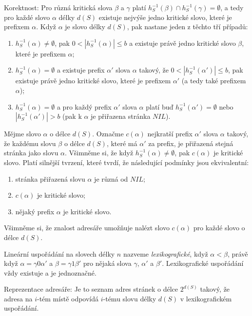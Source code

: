 \documentclass[a4paper,12pt]{article}
\begin{document}
Korektnost: Pro různá kritická slova 
$\beta$ a $\gamma$ platí $h^{-1}_S(\beta )\cap h^{-1}_S(\gamma 
)=\emptyset$, a tedy pro každé slovo $\alpha$ 
délky $d(S)$ existuje nejvýše jedno kritické slovo, které 
je prefixem $\alpha$. Když $\alpha$ je slovo délky $d(S)$, pak nastane 
jeden z těchto tří případů:
\begin{enumerate}
\item
$h^{-1}_S(\alpha )\ne\emptyset$, pak $0<|h^{-1}_S(\alpha )|\le b$ a existuje právě jedno kritické slovo $
\beta$, 
které je prefixem $\alpha$; 
\item
$h^{-1}_S(\alpha )=\emptyset$ a existuje prefix $\alpha'$ slova $
\alpha$ takový, že 
$0<|h^{-1}_S(\alpha')|\le b$, pak existuje právě jedno kritické slovo, které je 
prefixem $\alpha'$ (a tedy také prefixem $\alpha$);
\item
$h^{-1}_S(\alpha )=\emptyset$ a pro každý prefix $\alpha'$ slova $
\alpha$ platí buď 
$h^{-1}_S(\alpha')=\emptyset$ nebo $|h^{-1}_S(\alpha')|>b$ (pak k $
\alpha$ je přiřazena 
stránka $NIL$).
\end{enumerate}

Mějme slovo $\alpha$ o délce $d(S)$. Označme $c
(\alpha )$ nejkratší 
prefix $\alpha'$ slova $\alpha$ takový, že každému slovu $\beta$ o délce $d(S)$, které má $\alpha'$ 
za prefix, je přiřazená stejná stránka jako slovu $\alpha$. Všimněme si, že když $h^{
-1}_S(\alpha )\ne\emptyset$, pak $c(\alpha )$ je 
kritické slovo. Platí silnější tvrzení, které tvrdí, že 
následující podmínky jsou ekvivalentní:
\begin{enumerate}
\item
stránka přiřazená slovu $\alpha$ je různá od $
NIL$;
\item
$c(\alpha )$ je kritické slovo;
\item
nějaký prefix $\alpha$ je kritické slovo.
\end{enumerate}
Všimněme si, že znalost adresáře umožňuje nalézt slovo 
$c(\alpha )$ pro každé slovo o délce $d(S)$.

Lineární uspořádání na slovech délky $
n$ nazveme 
\emph{lexikografické}, když $\alpha <\beta$, právě když 
$\alpha =\gamma 0\alpha'$ a $\beta =\gamma 1\beta'$ pro nějaká slova $
\gamma$, $\alpha'$ a $\beta'$. 
Lexikografické uspořádání vždy existuje a je 
jednoznačné.

Reprezentace adresáře: Je to seznam adres 
stránek o délce $2^{d(S)}$ takový, že adresa na $i$-tém místě 
odpovídá $i$-tému slovu délky $d(S)$ v lexikografickém 
uspořádání.
\end{document}
